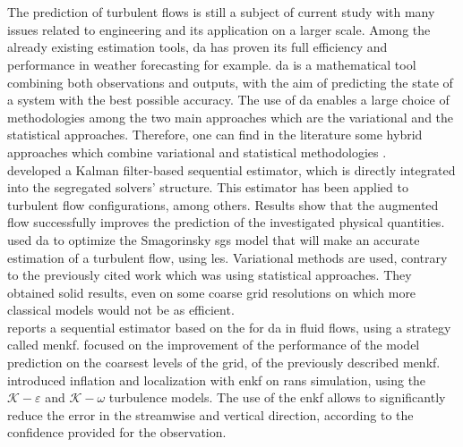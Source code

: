 \documentclass[12pt,twoside]{report}
\newcommand{\keps}{$\mathcal{K}-\varepsilon$ }
\newcommand{\kom}{$\mathcal{K}-\omega$ }
\begin{document}
\section{}

The prediction of turbulent flows is still a subject of current study with many issues related to engineering and its application on a larger scale. Among the already existing estimation tools, \gls{da} has proven its full efficiency and performance in weather forecasting for example. \gls{da} is a mathematical tool combining both observations and outputs, with the aim of predicting the state of a system with the best possible accuracy. The use of \gls{da} enables a large choice of methodologies among the two main approaches which are the variational and the statistical approaches. Therefore, one can find in the literature some hybrid approaches which combine variational and statistical methodologies \citep[see][]{bocquet_data_2016}.  \\

\cite{meldi_reduced_2017} developed a Kalman filter-based sequential estimator, which is directly integrated into the segregated solvers’ structure. This estimator has been applied to turbulent flow configurations, among others. Results show that the augmented flow successfully improves the prediction of the investigated physical quantities. \\

\cite{mons_2021_da} used \gls{da} to optimize the Smagorinsky \gls{sgs} model that will make an accurate estimation of a turbulent flow, using \gls{les}. Variational methods are used, contrary to the previously cited work which was using statistical approaches. They obtained solid results, even on some coarse grid resolutions on which more classical models would not be as efficient. \\

\cite{moldovan_multigridensemble_2021} reports a sequential estimator based on the  for \gls{da} in fluid flows, using a strategy called \gls{menkf}. \cite{moldovan_optimized_2022} focused on the improvement of the performance of the model prediction on the coarsest levels of the grid, of the previously described \gls{menkf}. \\

\cite{villanueva_augmented_2023} introduced inflation and localization with \gls{enkf} on \gls{rans} simulation, using the \keps and \kom turbulence models. The use of the \gls{enkf} allows to significantly reduce the error in the streamwise and vertical direction, according to the confidence provided for the observation. \\
\end{document}
